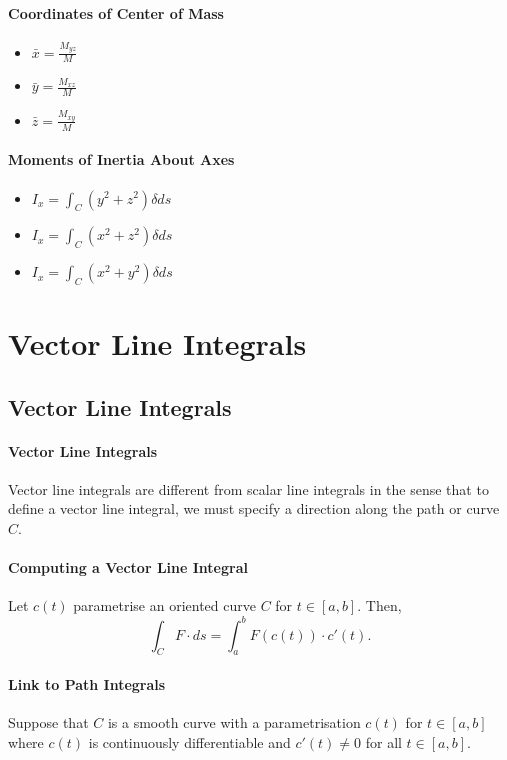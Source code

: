 \paragraph{Coordinates of Center of Mass}  
\begin{itemize}
    \item \(\bar{x} = \frac{M_{yz}}{M}\)
    \item \(\bar{y} = \frac{M_{xz}}{M}\)
    \item \(\bar{z} = \frac{M_{xy}}{M}\)
\end{itemize}

\paragraph{Moments of Inertia About Axes}
\begin{itemize}
    \item \(I_x = \int_C (y^2 + z^2) \delta ds\)
    \item \(I_x = \int_C (x^2 + z^2) \delta ds\)
    \item \(I_x = \int_C (x^2 + y^2) \delta ds\)
\end{itemize}


\section{Vector Line Integrals}

\subsection{Vector Line Integrals}


\paragraph{Vector Line Integrals}  
Vector line integrals are different from scalar line integrals in the
sense that to define a vector line integral, we must specify a direction
along the path or curve \(C\).

\paragraph{Computing a Vector Line Integral}
Let \(c(t)\) parametrise an oriented curve \(C\) for \(t\in [a, b]\).
Then, 
\[
    \int_C F\cdot ds = \int_a^b F(c(t)) \cdot c'(t).
\]

\paragraph{Link to Path Integrals}
Suppose that \(C\) is a smooth curve with a parametrisation \(c(t)\)
for \(t\in[a, b]\) where \(c(t)\) is continuously differentiable and
\(c'(t) \neq 0\) for all \(t\in [a, b]\).

